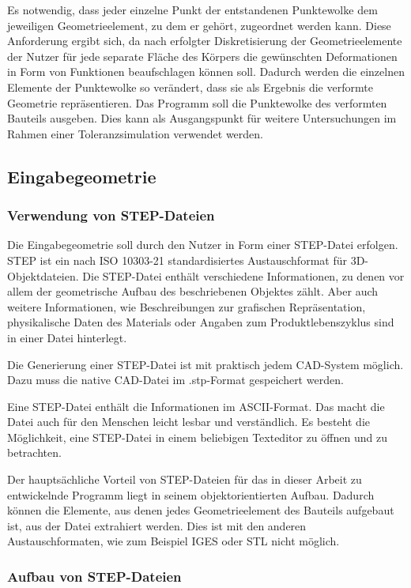 Es notwendig, dass jeder einzelne Punkt der entstandenen Punktewolke dem jeweiligen Geometrieelement, zu dem er gehört, zugeordnet werden kann. Diese Anforderung ergibt sich, da nach erfolgter Diskretisierung der Geometrieelemente der Nutzer für jede separate Fläche des Körpers die gewünschten Deformationen in Form von Funktionen beaufschlagen können soll. Dadurch werden die einzelnen Elemente der Punktewolke so verändert, dass sie als Ergebnis die verformte Geometrie repräsentieren. 
Das Programm soll die Punktewolke des verformten Bauteils ausgeben. Dies kann als Ausgangspunkt für weitere Untersuchungen im Rahmen einer Toleranzsimulation verwendet werden.      
 
\subsection{Eingabegeometrie} 
\label{sec:eingabegeometrie}

\subsubsection{Verwendung von STEP-Dateien}
 
Die Eingabegeometrie soll durch den Nutzer in Form einer STEP-Datei erfolgen. STEP ist ein nach ISO 10303-21 standardisiertes Austauschformat für 3D-Objektdateien. Die STEP-Datei enthält verschiedene Informationen, zu denen vor allem der geometrische Aufbau des beschriebenen Objektes zählt. Aber auch weitere Informationen, wie Beschreibungen zur grafischen Repräsentation, physikalische Daten des Materials oder Angaben zum Produktlebenszyklus sind in einer Datei hinterlegt. 

Die Generierung einer STEP-Datei ist mit praktisch jedem CAD-System möglich. Dazu muss die native CAD-Datei im .stp-Format gespeichert werden.

Eine STEP-Datei enthält die Informationen im ASCII-Format. Das macht die Datei auch für den Menschen leicht lesbar und verständlich. Es besteht die Möglichkeit, eine STEP-Datei in einem beliebigen Texteditor zu öffnen und zu betrachten. 

Der hauptsächliche Vorteil von STEP-Dateien für das in dieser Arbeit zu entwickelnde Programm liegt in seinem objektorientierten Aufbau. Dadurch können die Elemente, aus denen jedes Geometrieelement des Bauteils aufgebaut ist, aus der Datei extrahiert werden. Dies ist mit den anderen Austauschformaten, wie zum Beispiel IGES oder STL nicht möglich. 

\subsubsection{Aufbau von STEP-Dateien}


